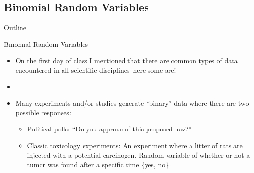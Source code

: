 \documentclass[xcolor=dvipsnames]{beamer}
\begin{document}
\subsection{Binomial Random Variables}
\begin{frame}{Outline}
	\tableofcontents[currentsection,subsectionstyle=show/shaded/hide]
\end{frame}

\begin{frame}{Binomial Random Variables}
	\begin{itemize}
		\item On the first day of class I mentioned that there are common types of data encountered in all scientific disciplines--here some are!
		\item[]
		\item Many experiments and/or studies generate ``binary'' data where there are two possible responses:
		\begin{itemize}
			\item Political polls: ``Do you approve of this proposed law?''
			\item Classic toxicology experiments: An experiment where a litter of rats are injected with a potential carcinogen. Random variable of whether or not a tumor was found after a specific time \{yes, no\}
		\end{itemize}
	\end{itemize}
\end{frame}
\end{document}
